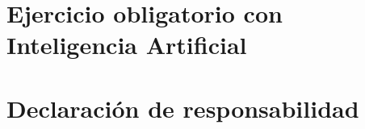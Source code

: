 \documentclass[12pt]{article} %
\begin{document}
\section*{Ejercicio obligatorio con Inteligencia Artificial}


\section*{Declaración de responsabilidad}




\end{document}
